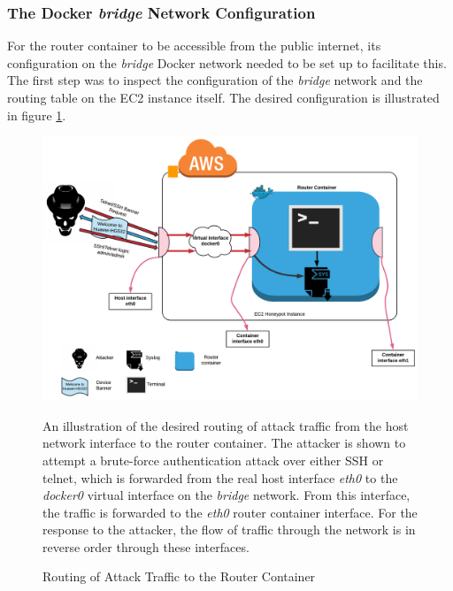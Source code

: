 \subsubsection{The Docker \textit{bridge} Network Configuration}
For the router container to be accessible from the public internet, its configuration on the \textit{bridge} Docker network needed to  be set up to facilitate this. The first step was to inspect the configuration of the \textit{bridge} network and the routing table on the EC2 instance itself. The desired configuration is illustrated in figure \ref{fig:router-container-config}.

\begin{figure}[ht]
      \centering
      \includegraphics[width=160mm, scale=1]{Images/Router_container_config.png}
      \caption{Routing of Attack Traffic to the Router Container} 
      \medskip
      \small
		An illustration of the desired routing of attack traffic from the host network interface to the router container. The attacker is shown to attempt a brute-force authentication attack over either SSH or telnet, which is forwarded from the real host interface \textit{eth0} to the \textit{docker0} virtual interface on the \textit{bridge} network. From this interface, the traffic is forwarded to the \textit{eth0} router container interface. For the response to the attacker, the flow of traffic through the network is in reverse order through these interfaces. 
\label{fig:router-container-config}
\end{figure}


